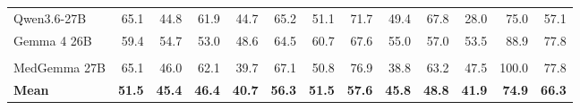 \documentclass{llmxive}
\begin{document}
\begin{figure}[htbp]
{\begin{tabular}{@{}l*{12}{r}@{}}
\midrule
Qwen3.6-27B               & 65.1 & 44.8 & 61.9 & 44.7 & 65.2 & 51.1 & 71.7 & 49.4 & 67.8 & 28.0 & 75.0 & 57.1 \\
Gemma 4 26B           & 59.4 & 54.7 & 53.0 & 48.6 & 64.5 & 60.7 & 67.6 & 55.0 & 57.0 & 53.5 & 88.9 & 77.8 \\
\addlinespace[1pt]
\multicolumn{13}{c}{\textit{Medical-domain LLMs}} \\
\midrule
MedGemma 27B          & 65.1 & 46.0 & 62.1 & 39.7 & 67.1 & 50.8 & 76.9 & 38.8 & 63.2 & 47.5 & 100.0 & 77.8 \\
\midrule
\textbf{Mean} & \textbf{51.5} & \textbf{45.4} & \textbf{46.4} & \textbf{40.7} & \textbf{56.3} & \textbf{51.5} & \textbf{57.6} & \textbf{45.8} & \textbf{48.8} & \textbf{41.9} & \textbf{74.9} & \textbf{66.3} \\
\bottomrule
\end{tabular}
\hspace{0pt}}

\vspace{0.35em}


\end{figure}
\end{document}
